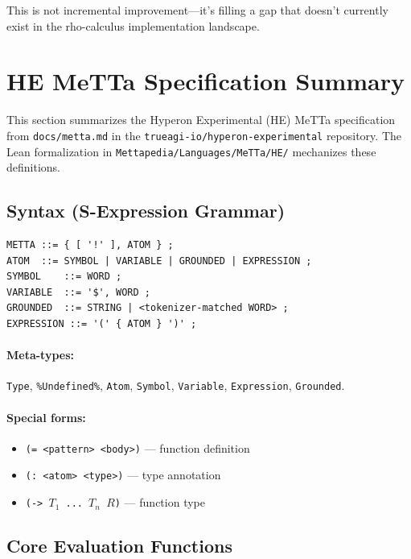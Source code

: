 \documentclass[11pt]{article}
\newcommand{\code}[1]{\texttt{#1}}
\newcommand{\HE}{\textup{HE}}
\begin{document}
This is not incremental improvement---it's filling a gap that doesn't
currently exist in the rho-calculus implementation landscape.

\section{HE MeTTa Specification Summary}
\label{sec:he-spec}

This section summarizes the Hyperon Experimental (\HE{}) MeTTa specification
from \code{docs/metta.md} in the \code{trueagi-io/hyperon-experimental}
repository.  The Lean formalization in \code{Mettapedia/Languages/MeTTa/HE/}
mechanizes these definitions.

\subsection{Syntax (S-Expression Grammar)}

\begin{lstlisting}[language={}]
METTA ::= { [ '!' ], ATOM } ;
ATOM  ::= SYMBOL | VARIABLE | GROUNDED | EXPRESSION ;
SYMBOL    ::= WORD ;
VARIABLE  ::= '$', WORD ;
GROUNDED  ::= STRING | <tokenizer-matched WORD> ;
EXPRESSION ::= '(' { ATOM } ')' ;
\end{lstlisting}

\paragraph{Meta-types:} \code{Type}, \code{\%Undefined\%}, \code{Atom},
\code{Symbol}, \code{Variable}, \code{Expression}, \code{Grounded}.

\paragraph{Special forms:}
\begin{itemize}[nosep]
  \item \code{(= <pattern> <body>)} --- function definition
  \item \code{(: <atom> <type>)} --- type annotation
  \item \code{(-> $T_1$ ... $T_n$ $R$)} --- function type
\end{itemize}

\subsection{Core Evaluation Functions}
\end{document}
